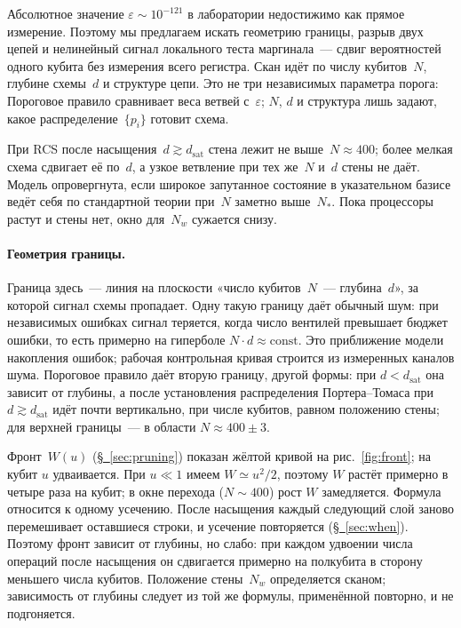 \documentclass[11pt,a4paper]{article}
\newcommand{\CollapseRule}{Пороговое правило}
\begin{document}
Абсолютное значение $\varepsilon\sim 10^{-121}$ в лаборатории недостижимо как прямое измерение. Поэтому мы предлагаем искать геометрию границы, разрыв двух цепей и нелинейный сигнал локального теста маргинала~--- сдвиг вероятностей одного кубита без измерения всего регистра. Скан идёт по числу кубитов~$N$, глубине схемы~$d$ и структуре цепи. Это не три независимых параметра порога: \CollapseRule{} сравнивает веса ветвей с~$\varepsilon$; $N$, $d$ и структура лишь задают, какое распределение~$\{p_i\}$ готовит схема.

При RCS после насыщения~$d\gtrsim d_{\mathrm{sat}}$ стена лежит не выше~$N\approx400$; более мелкая схема сдвигает её по~$d$, а узкое ветвление при тех же~$N$ и~$d$ стены не даёт. Модель опровергнута, если широкое запутанное состояние в указательном базисе ведёт себя по стандартной теории при~$N$ заметно выше~$N_*$. Пока процессоры растут и стены нет, окно для~$N_w$ сужается снизу.

\paragraph{Геометрия границы.}
Граница здесь~--- линия на плоскости «число кубитов~$N$~--- глубина~$d$», за которой сигнал схемы пропадает. Одну такую границу даёт обычный шум: при независимых ошибках сигнал теряется, когда число вентилей превышает бюджет ошибки, то есть примерно на гиперболе $N\cdot d\approx\mathrm{const}$. Это приближение модели накопления ошибок; рабочая контрольная кривая строится из измеренных каналов шума. \CollapseRule{} даёт вторую границу, другой формы: при $d<d_{\mathrm{sat}}$ она зависит от глубины, а после установления распределения Портера--Томаса при $d\gtrsim d_{\mathrm{sat}}$ идёт почти вертикально, при числе кубитов, равном положению стены; для верхней границы~--- в области $N\approx400\pm3$.

Фронт~$W(u)$ (\hyperref[sec:pruning]{\S~\ref*{sec:pruning}}) показан жёлтой кривой на рис.~\ref{fig:front}; на кубит $u$ удваивается. При $u\ll1$ имеем $W\simeq u^2/2$, поэтому $W$ растёт примерно в четыре раза на кубит; в окне перехода ($N\sim400$) рост $W$ замедляется. Формула относится к одному усечению. После насыщения каждый следующий слой заново перемешивает оставшиеся строки, и усечение повторяется (\hyperref[sec:when]{\S~\ref*{sec:when}}). Поэтому фронт зависит от глубины, но слабо: при каждом удвоении числа операций после насыщения он сдвигается примерно на полкубита в сторону меньшего числа кубитов. Положение стены~$N_w$ определяется сканом; зависимость от глубины следует из той же формулы, применённой повторно, и не подгоняется.
\end{document}

